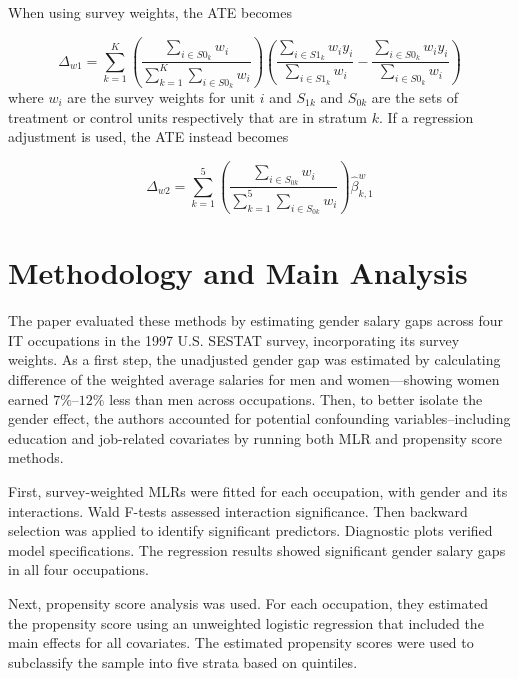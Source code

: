 \documentclass[12pt]{article}
\begin{document}
When using survey weights, the ATE becomes

\begin{equation}
\Delta_{w1} = \sum_{k=1}^{K} \left( 
\frac{\sum_{i \in S0_k} w_i}{\sum_{k=1}^{K} \sum_{i \in S0_k} w_i} 
\right) \left( 
\frac{\sum_{i \in S1_k} w_i y_i}{\sum_{i \in S1_k} w_i} - 
\frac{\sum_{i \in S0_k} w_i y_i}{\sum_{i \in S0_k} w_i} 
\right) 
\label{eq:ate_weights}
\end{equation}
where $w_i$ are the survey weights for unit $i$ and $S_{1k}$ and $S_{0k}$ are the sets of treatment or control units respectively that are in stratum $k$. If a regression adjustment is used, the ATE instead becomes 

\begin{equation}
\Delta_{w2} = \sum_{k=1}^{5} 
\left( 
\frac{\sum_{i \in S_{0k}} w_i}{\sum_{k=1}^{5} \sum_{i \in S_{0k}} w_i} 
\right) 
\hat{\beta}^{w}_{k,1}
\label{eq:ate_regadj}
\end{equation}



\section{Methodology and Main Analysis} \label{sec:meth_analysis}

The paper evaluated these methods by estimating gender salary gaps across four IT occupations in the 1997 U.S. SESTAT survey, incorporating its survey weights. As a first step, the unadjusted gender gap was estimated by calculating difference of the weighted average salaries for men and women—showing women earned $7\%\text{--}12\%$ less than men across occupations. Then, to better isolate the gender effect, the authors accounted for potential confounding variables--including education and job-related covariates by running both MLR and propensity score methods.

First, survey-weighted MLRs were fitted for each occupation, with gender and its interactions. Wald F-tests assessed interaction significance. Then backward selection was applied to identify significant predictors. Diagnostic plots verified model specifications. The regression results showed significant gender salary gaps in all four occupations. 

Next, propensity score analysis was used. For each occupation, they estimated the propensity score using an unweighted logistic regression that included the main effects for all covariates. The estimated propensity scores were used to subclassify the sample into five strata based on quintiles.
\end{document}
